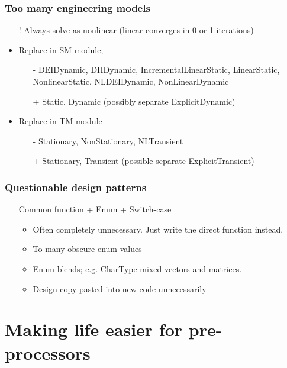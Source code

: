 \documentclass[11pt]{beamer} %
\begin{document}
\begin{frame}
 \frametitle{Too many engineering models}
\begin{itemize}
 \item[!] Always solve as nonlinear (linear converges in 0 or 1 iterations)
 \item Replace in SM-module;
  \begin{itemize}
   \item[-] DEIDynamic, DIIDynamic, IncrementalLinearStatic, LinearStatic, NonlinearStatic, NLDEIDynamic, NonLinearDynamic
   \item[+] Static, Dynamic (possibly separate ExplicitDynamic)
  \end{itemize}
 \item Replace in TM-module
  \begin{itemize}
   \item[-] Stationary, NonStationary, NLTransient
   \item[+] Stationary, Transient (possible separate ExplicitTransient)
  \end{itemize}
\end{itemize}
\end{frame}


\begin{frame}
 \frametitle{Questionable design patterns}
\begin{itemize}
 \item[\frownie] Common function + Enum + Switch-case
  \begin{itemize}
   \item Often completely unnecessary. Just write the direct function instead.
   \item To many obscure enum values
   \item Enum-blends; e.g. CharType mixed vectors and matrices.
   \item Design copy-pasted into new code unnecessarily
  \end{itemize}
\end{itemize}
\end{frame}

\section{Making life easier for pre-processors}
\end{document}
